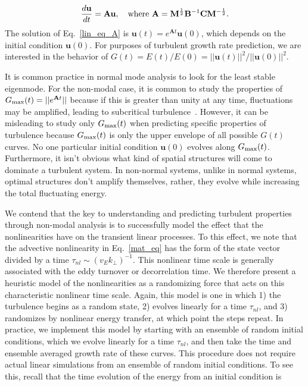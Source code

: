 \documentclass[letter,scriptaddress,twocolumn, prl,showkeys]{revtex4}
\def\beq{\begin{equation}}
\def\eeq{\end{equation}}
\newcommand{\diff}[2]{\frac{d#1}{d#2}}
\begin{document}
\beq
\label{lin_eq_A}
\diff{\mathbf{u}}{t} = \mathbf{A} \mathbf{u},  \quad \rm{where} \ \mathbf{A} = \mathbf{M}^{\frac{1}{2}} \mathbf{B}^{-1} \mathbf{C} \mathbf{M}^{-\frac{1}{2}}.
\eeq
The solution of Eq.~\ref{lin_eq_A} is $\mathbf{u}(t) = e^{\mathbf{A} t} \mathbf{u}(0)$, which
depends on the initial condition $\mathbf{u}(0)$. For purposes of turbulent growth rate prediction, we are interested in
the behavior of $G(t) = E(t)/E(0) = ||\mathbf{u}(t)||^2/||\mathbf{u}(0)||^2$.


It is common practice in normal mode analysis to look for the least stable eigenmode. 
For the non-modal case, it is common to study the properties of $G_{\rm{max}}(t) = ||e^{\mathbf{A} t}||$ because if this is greater than unity at any time, fluctuations may be amplified, 
leading to subcritical turbulence~\cite{trefethen2005,schmid2007}.
However, it can be misleading to study only $G_{\rm{max}}(t)$ when predicting specific properties of turbulence because
$G_{\rm{max}}(t)$ is only the upper envelope of all possible $G(t)$ curves. No one particular initial condition $\mathbf{u}(0)$ evolves along $G_{\rm{max}}(t)$. 
Furthermore, it isn't obvious what kind of spatial structures will come to dominate a turbulent system.
In non-normal systems, unlike in normal systems, optimal structures don't amplify themselves, rather, they evolve while increasing the total fluctuating energy.

We contend that the key to understanding and predicting turbulent properties through non-modal analysis is 
to successfully model the effect that the nonlinearities have on the transient linear processes. 
To this effect, we note that the advective nonlinearity in Eq.~\ref{mat_eq} has the form of the state vector divided by a time $\tau_{nl} \sim (v_E k_\perp)^{-1}$. This nonlinear
time scale is generally associated with the eddy turnover or decorrelation time. We therefore present a heuristic model of the nonlinearities 
as a randomizing force that acts on this characteristic nonlinear time scale. Again, this model is one in which 1) the turbulence begins as a random state, 
2) evolves linearly for a time $\tau_{nl}$, and 3) randomizes by nonlinear energy transfer, at which point the steps repeat.
In practice, we implement this model by starting with an ensemble of random initial conditions, which we evolve linearly for a time $\tau_{nl}$, 
and then take the time and ensemble averaged growth rate of these curves.
This procedure does not require actual linear simulations from an ensemble of random initial conditions. To see this, recall that the time evolution of the energy from an initial condition is
\end{document}
